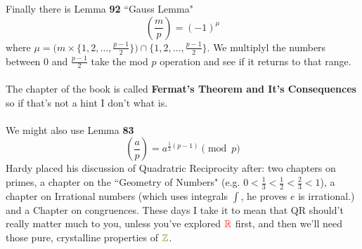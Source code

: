 \documentclass[12pt]{article}
\begin{document}
\\ \\
Finally there is Lemma {\color{orange!75!green}\textbf{92}} ``Gauss Lemma"
$$ \left( \frac{m}{p} \right) = (-1)^\mu $$
where $\mu = \big(  m \times \{ 1, 2, \dots , \frac{p-1}{2} \}  \big)\cap \{ 1, 2, \dots , \frac{p-1}{2} \} $.  We multiplyl the numbers between $0$ and $\frac{p-1}{2}$ take the mod $p$ operation and see if it returns to that range. \\ \\
The chapter of the book is called \textbf{Fermat's Theorem and It's Consequences} so if that's not a hint I don't what is. \\ \\
We might also use Lemma {\color{orange!75!green}\textbf{83}}
$$ \left( \frac{a}{p} \right) = a^{\frac{1}{2}(p-1)} \pmod p $$
Hardy placed his discussion of Quadratric Reciprocity after: two chapters on primes, a chapter on the ``Geometry of Numbers" (e.g. $0 < \frac{1}{3} < \frac{1}{2} < \frac{2}{3} < 1 $), a chapter on Irrational numbers (which uses integrals $\int$, he proves $e$ is irrational.) and a Chapter on congruences.   These days I take it to mean that QR should't really matter much to you, unless you've explored ${\color{red}\mathbb{R}}$ first, and then we'll need those pure, crystalline properties of ${\color{green!50!red}\mathbb{Z}}$.

\newpage
\end{document}
